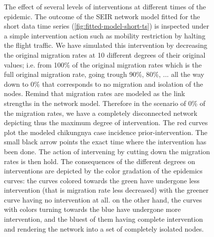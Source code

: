 \documentclass[10pt,a4paper]{article}
\begin{document}
\begin{figure}
\centering
{}
\hspace{0mm}
\hspace{0mm}
\hspace{0mm}
\hspace{0mm}
\caption{\small The effect of several levels of interventions at different times of the epidemic. The outcome of the SEIR network model fitted for the short data time series (\ref{fig:fitted-model-short-ts}) is inspected under a simple intervention action such as mobility restriction by halting the flight traffic. 
%
We have simulated this intervention by decreasing the original migration rates at 10 different degrees of their original values; i.e. from 100\% of the original migration rates which is the full original migration rate, going trough 90\%, 80\%, ... all the way down to 0\% that corresponds to no migration and isolation of the nodes. Remind that migration rates are modeled as the link strengths in the network model. Therefore in the scenario of 0\% of the migration rates, we have a completely disconnected network depicting thus the maximum degree of intervention. The red curves plot the modeled chikungnya case incidence prior-intervention. The small black arrow points the exact time where the intervention has been done. The action of intervening by cutting down the migration rates is then hold. The consequences of the different degrees on interventions are depicted by the color gradation of the epidemics curves: the curves colored  towards the green have undergone less intervention (that is migration rate less decreased) with the greener curve having no intervention at all. on the other hand, the curves with colors turning towards the blue have undergone more intervention, and the bluest of them having complete intervention and rendering the network into a set of completely isolated nodes.}
\end{figure}
\end{document}
